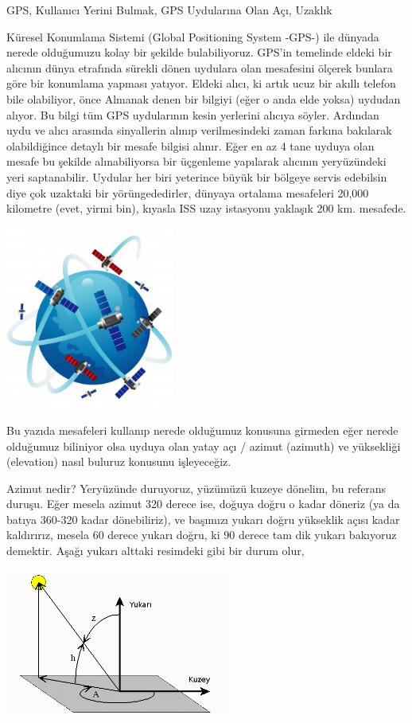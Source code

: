 \documentclass[12pt,fleqn]{article}\usepackage{../../common}
\begin{document}
GPS, Kullanıcı Yerini Bulmak, GPS Uydularına Olan Açı, Uzaklık

Küresel Konumlama Sistemi (Global Positioning System -GPS-) ile dünyada
nerede olduğumuzu kolay bir şekilde bulabiliyoruz. GPS'in temelinde eldeki
bir alıcının dünya etrafında sürekli dönen uydulara olan mesafesini ölçerek
bunlara göre bir konumlama yapması yatıyor. Eldeki alıcı, ki artık ucuz bir
akıllı telefon bile olabiliyor, önce Almanak denen bir bilgiyi (eğer o anda
elde yoksa) uydudan alıyor. Bu bilgi tüm GPS uydularının kesin yerlerini
alıcıya söyler. Ardından uydu ve alıcı arasında sinyallerin alınıp
verilmesindeki zaman farkına bakılarak olabildiğince detaylı bir mesafe
bilgisi alınır. Eğer en az 4 tane uyduya olan mesafe bu şekilde
alınabiliyorsa bir üçgenleme yapılarak alıcının yeryüzündeki yeri
saptanabilir. Uydular her biri yeterince büyük bir bölgeye servis edebilsin
diye çok uzaktaki bir yörüngededirler, dünyaya ortalama mesafeleri 20,000
kilometre (evet, yirmi bin), kıyasla ISS uzay istasyonu yaklaşık 200
km. mesafede.

\includegraphics[width=15em]{sat1.jpg}

Bu yazıda mesafeleri kullanıp nerede olduğumuz konusuna girmeden eğer
nerede olduğumuz biliniyor olsa uyduya olan yatay açı / azimut (azimuth) ve
yüksekliği (elevation) nasıl buluruz konusunu işleyeceğiz.

Azimut nedir? Yeryüzünde duruyoruz, yüzümüzü kuzeye dönelim, bu referans
duruşu. Eğer mesela azimut 320 derece ise, doğuya doğru o kadar döneriz (ya
da batıya 360-320 kadar dönebiliriz), ve başımızı yukarı doğru yükseklik
açısı kadar kaldırırız, mesela 60 derece yukarı doğru, ki 90 derece tam dik
yukarı bakıyoruz demektir. Aşağı yukarı alttaki resimdeki gibi bir durum
olur,

\includegraphics[width=20em]{azelzen.png}
\end{document}
